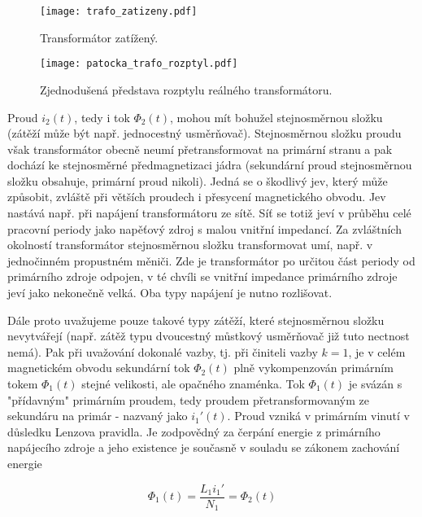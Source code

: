       \begin{wrapfigure}{r}{2.3in}
        \centering
        \texttt{[image: trafo\_zatizeny.pdf]}
        \caption{Transformátor zatížený.}
        \label{es:fig_trafo_zatizeny}
        \texttt{[image: patocka\_trafo\_rozptyl.pdf]}
        \caption{Zjednodušená představa rozptylu reálného transformátoru.}
        \label{es:fig_trafo_rozptyl}
      \end{wrapfigure}
      Proud $i_2(t)$, tedy i tok $\Phi_2(t)$, mohou mít bohužel stejnosměrnou složku (zátěží může být např. 
      jednocestný usměrňovač). Stejno\-směr\-nou složku prou\-du však transformátor obecně neumí 
      pře\-trans\-form\-ovat na primární stranu a pak do\-chází ke stejnosměrné před\-magnet\-izaci jádra 
      (sekundární proud stejno\-směr\-nou složku obsahuje, primární proud nikoli). Jedná se o škodlivý jev, 
      který může způsobit, zvláště při větších proudech i přesycení magnetického obvodu. Jev nastává např. 
      při napájení transformátoru ze sítě. Síť se totiž jeví v průběhu celé pracovní periody jako napěťový 
      zdroj s malou vnitřní impedancí. Za zvláštních okolností transformátor stejnosměrnou složku 
      transformovat umí, např. v jednočinném propustném měniči. Zde je transformátor po určitou část periody 
      od primárního zdroje odpojen, v té chvíli se vnitřní impedance primárního zdroje jeví jako nekonečně 
      velká. Oba typy napájení je nutno rozlišovat.

      Dále proto uvažujeme pouze takové typy zátěží, které stejnosměrnou složku ne\-vy\-tvá\-ře\-jí      
      (např. zátěž typu dvoucestný můstkový usměrňovač již tuto nectnost nemá). Pak při uvažování dokonalé 
      vazby, tj. při činiteli vazby $k=1$, je v celém magnetickém obvodu sekundární tok $\Phi_2(t)$ plně 
      vykompenzován primárním tokem $\Phi_1(t)$ stejné velikosti, ale opačného znaménka. Tok $\Phi_1(t)$ je 
      svázán s "přídavným" primárním proudem, tedy proudem pře\-trans\-formovaným ze sekundáru na primár - 
      nazvaný jako $i_1'(t)$. Proud vzniká v primárním vinutí v důsledku Lenzova pravidla. Je zodpovědný za 
      čerpání energie z primárního napájecího zdroje a jeho existence je současně v souladu se zákonem 
      zachování energie

      \begin{equation}\label{es:eq_zachovani_energie}
        \Phi_1(t)=\frac{L_1i_1'}{N_1}=\Phi_2(t)
      \end{equation}


